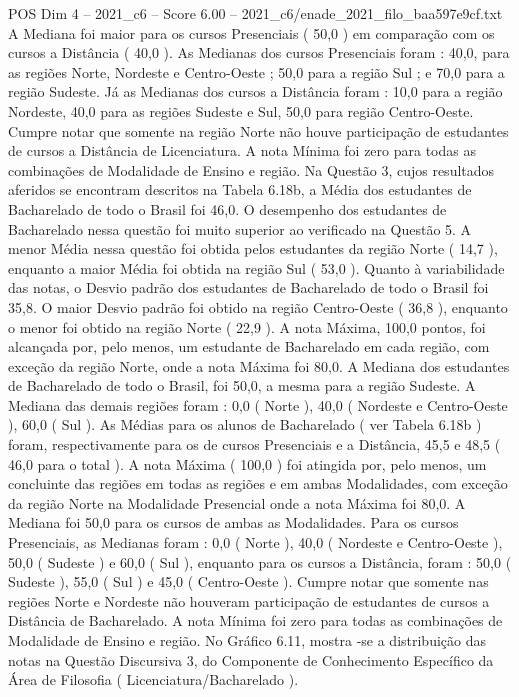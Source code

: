 \begin{textsample}{POS Dim 4 – 2021\_c6 – Score 6.00 – 2021\_c6/enade\_2021\_filo\_baa597e9cf.txt}
A Mediana foi maior para os cursos Presenciais ( 50,0 ) em comparação com os cursos a Distância ( 40,0 ).
As Medianas dos cursos Presenciais foram : 40,0, para as regiões Norte, Nordeste e Centro-Oeste ; 50,0 para a região Sul ; e 70,0 para a região Sudeste.
Já as Medianas dos cursos a Distância foram : 10,0 para a região Nordeste, 40,0 para as regiões Sudeste e Sul, 50,0 para região Centro-Oeste.
Cumpre notar que somente na região Norte não houve participação de estudantes de cursos a Distância de Licenciatura.
A nota Mínima foi zero para todas as combinações de Modalidade de Ensino e região.
Na Questão 3, cujos resultados aferidos se encontram descritos na Tabela 6.18b, a Média dos estudantes de Bacharelado de todo o Brasil foi 46,0.
O desempenho dos estudantes de Bacharelado nessa questão foi muito superior ao verificado na Questão 5.
A menor Média nessa questão foi obtida pelos estudantes da região Norte ( 14,7 ), enquanto a maior Média foi obtida na região Sul ( 53,0 ).
Quanto à variabilidade das notas, o Desvio padrão dos estudantes de Bacharelado de todo o Brasil foi 35,8.
O maior Desvio padrão foi obtido na região Centro-Oeste ( 36,8 ), enquanto o menor foi obtido na região Norte ( 22,9 ).
A nota Máxima, 100,0 pontos, foi alcançada por, pelo menos, um estudante de Bacharelado em cada região, com exceção da região Norte, onde a nota Máxima foi 80,0.
A Mediana dos estudantes de Bacharelado de todo o Brasil, foi 50,0, a mesma para a região Sudeste.
A Mediana das demais regiões foram : 0,0 ( Norte ), 40,0 ( Nordeste e Centro-Oeste ), 60,0 ( Sul ).
As Médias para os alunos de Bacharelado ( ver Tabela 6.18b ) foram, respectivamente para os de cursos Presenciais e a Distância, 45,5 e 48,5 ( 46,0 para o total ).
A nota Máxima ( 100,0 ) foi atingida por, pelo menos, um concluinte das regiões em todas as regiões e em ambas Modalidades, com exceção da região Norte na Modalidade Presencial onde a nota Máxima foi 80,0.
A Mediana foi 50,0 para os cursos de ambas as Modalidades.
Para os cursos Presenciais, as Medianas foram : 0,0 ( Norte ), 40,0 ( Nordeste e Centro-Oeste ), 50,0 ( Sudeste ) e 60,0 ( Sul ), enquanto para os cursos a Distância, foram : 50,0 ( Sudeste ), 55,0 ( Sul ) e 45,0 ( Centro-Oeste ).
Cumpre notar que somente nas regiões Norte e Nordeste não houveram participação de estudantes de cursos a Distância de Bacharelado.
A nota Mínima foi zero para todas as combinações de Modalidade de Ensino e região.
No Gráfico 6.11, mostra -se a distribuição das notas na Questão Discursiva 3, do Componente de Conhecimento Específico da Área de Filosofia ( Licenciatura/Bacharelado ).

\end{textsample}
